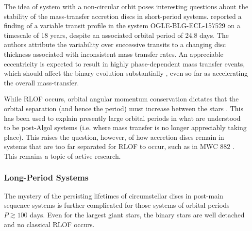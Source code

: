 \documentclass[%
 reprint,
 amsmath,amssymb,
 aps,
rmp,
floatfix,
]{revtex4-2}
\begin{document}
The idea of system with a non-circular orbit poses interesting questions about the stability of the mass-transfer accretion discs in short-period systems. \citet{Mennickent2021A&A} reported a finding of a variable transit profile in the system OGLE-BLG-ECL-157529 on a timescale of 18 years, despite an associated orbital period of 24.8 days. The authors attribute the variability over successive transits to a changing disc thickness associated with inconsistent mass transfer rates. An appreciable eccentricity is expected to result in highly phase-dependent mass transfer events, which should affect the binary evolution substantially \citep{Davis2013A&A}, even so far as accelerating the overall mass-transfer. 

While RLOF occurs, orbital angular momentum conservation dictates that the orbital separation (and hence the period) must increase between the stars \citep{Zhou2018ApJ}. This has been used to explain presently large orbital periods in what are understood to be post-Algol systems (i.e. where mass transfer is no longer appreciably taking place). This raises the question, however, of how accretion discs remain in systems that are too far separated for RLOF to occur, such as in MWC 882 \citep{Zhou2018ApJ}. This remains a topic of active research.


\subsubsection{Long-Period Systems}
The mystery of the persisting lifetimes of circumstellar discs in post-main sequence systems is further complicated for those systems of orbital periods $P \gtrsim 100$ days. Even for the largest giant stars, the binary stars are well detached and no classical RLOF occurs. 
\end{document}
